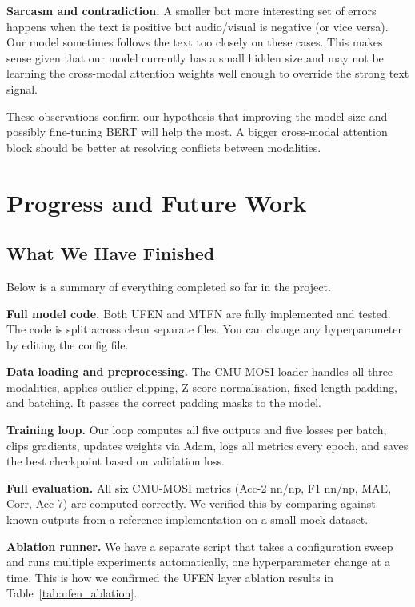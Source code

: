 \documentclass[11pt,twocolumn]{article}
\begin{document}
\textbf{Sarcasm and contradiction.} A smaller but more interesting set of errors happens when the text is positive but audio/visual is negative (or vice versa). Our model sometimes follows the text too closely on these cases. This makes sense given that our model currently has a small hidden size and may not be learning the cross-modal attention weights well enough to override the strong text signal.

These observations confirm our hypothesis that improving the model size and possibly fine-tuning BERT will help the most. A bigger cross-modal attention block should be better at resolving conflicts between modalities.

\section{Progress and Future Work}
\label{sec:progress}

\subsection{What We Have Finished}

Below is a summary of everything completed so far in the project.

\textbf{Full model code.} Both UFEN and MTFN are fully implemented and tested. The code is split across clean separate files. You can change any hyperparameter by editing the config file.

\textbf{Data loading and preprocessing.} The CMU-MOSI loader handles all three modalities, applies outlier clipping, Z-score normalisation, fixed-length padding, and batching. It passes the correct padding masks to the model.

\textbf{Training loop.} Our loop computes all five outputs and five losses per batch, clips gradients, updates weights via Adam, logs all metrics every epoch, and saves the best checkpoint based on validation loss.

\textbf{Full evaluation.} All six CMU-MOSI metrics (Acc-2 nn/np, F1 nn/np, MAE, Corr, Acc-7) are computed correctly. We verified this by comparing against known outputs from a reference implementation on a small mock dataset.

\textbf{Ablation runner.} We have a separate script that takes a configuration sweep and runs multiple experiments automatically, one hyperparameter change at a time. This is how we confirmed the UFEN layer ablation results in Table~\ref{tab:ufen_ablation}.
\end{document}
